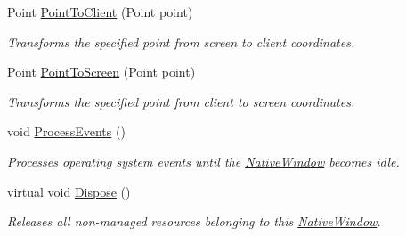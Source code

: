 \begin{DoxyCompactItemize}
Point \hyperlink{class_open_t_k_1_1_native_window_a4807376063a7cc130ca6b6dfb4b4a24f}{Point\-To\-Client} (Point point)
\begin{DoxyCompactList}\small\item\em Transforms the specified point from screen to client coordinates. \end{DoxyCompactList}\item 
Point \hyperlink{class_open_t_k_1_1_native_window_a631e83f783213650f854a7c953a4f34d}{Point\-To\-Screen} (Point point)
\begin{DoxyCompactList}\small\item\em Transforms the specified point from client to screen coordinates. \end{DoxyCompactList}\item 
void \hyperlink{class_open_t_k_1_1_native_window_a8150f2aa496459e492965c4577ec0dc9}{Process\-Events} ()
\begin{DoxyCompactList}\small\item\em Processes operating system events until the \hyperlink{class_open_t_k_1_1_native_window}{Native\-Window} becomes idle. \end{DoxyCompactList}\item 
virtual void \hyperlink{class_open_t_k_1_1_native_window_a1cc77f20d1c61f32d62e03896e358d20}{Dispose} ()
\begin{DoxyCompactList}\small\item\em Releases all non-\/managed resources belonging to this \hyperlink{class_open_t_k_1_1_native_window}{Native\-Window}. \end{DoxyCompactList}\end{DoxyCompactItemize}
